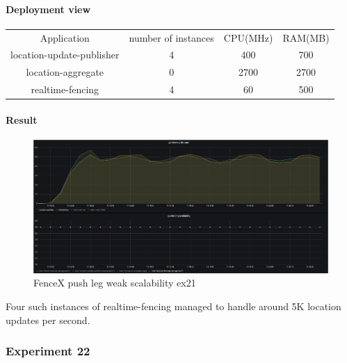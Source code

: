 \documentclass[a4]{report}
\begin{document}
        \paragraph{Deployment view}
        \begin{center}
            \begin{tabular}{ c c c c }
                Application               & number of instances & CPU(MHz) & RAM(MB) \\
                location-update-publisher & 4                   & 400      & 700     \\
                location-aggregate        & 0                   & 2700     & 2700    \\
                realtime-fencing          & 4                   & 60       & 500     \\
            \end{tabular}
        \end{center}

        \paragraph{Result}
        \begin{figure}[ht]
            \caption{FenceX push leg weak scalability ex21}
            \label{fig:ex21}
            \includegraphics[scale=0.4]{images/evaluation/ex21-benchmarking-ongoing-1per6sec.png}
        \end{figure}
        Four such instances of realtime-fencing managed to handle around 5K location updates per second.

        \subsubsection{Experiment 22}
\end{document}
